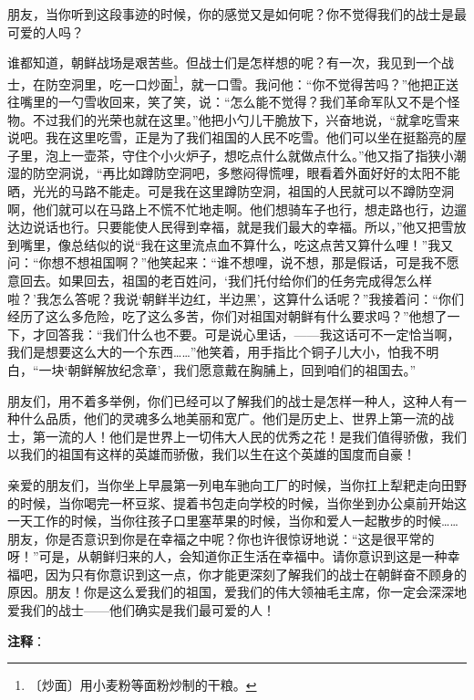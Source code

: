 \documentclass[12pt,UTF-8,openany]{ctexbook}
\begin{document}
\begin{normalsize}
    朋友，当你听到这段事迹的时候，你的感觉又是如何呢？你不觉得我们的战士是最可爱的人吗？
    
    谁都知道，朝鲜战场是艰苦些。但战士们是怎样想的呢？有一次，我见到一个战士，在防空洞里，吃一口炒面\footnote{〔炒面〕用小麦粉等面粉炒制的干粮。}，就一口雪。我问他：“你不觉得苦吗？”他把正送往嘴里的一勺雪收回来，笑了笑，说：“怎么能不觉得？我们革命军队又不是个怪物。不过我们的光荣也就在这里。”他把小勺儿干脆放下，兴奋地说，“就拿吃雪来说吧。我在这里吃雪，正是为了我们祖国的人民不吃雪。他们可以坐在挺豁亮的屋子里，泡上一壶茶，守住个小火炉子，想吃点什么就做点什么。”他又指了指狭小潮湿的防空洞说，“再比如蹲防空洞吧，多憋闷得慌哩，眼看着外面好好的太阳不能晒，光光的马路不能走。可是我在这里蹲防空洞，祖国的人民就可以不蹲防空洞啊，他们就可以在马路上不慌不忙地走啊。他们想骑车子也行，想走路也行，边遛达边说话也行。只要能使人民得到幸福，就是我们最大的幸福。所以，”他又把雪放到嘴里，像总结似的说“我在这里流点血不算什么，吃这点苦又算什么哩！”我又问：“你想不想祖国啊？”他笑起来：“谁不想哩，说不想，那是假话，可是我不愿意回去。如果回去，祖国的老百姓问，‘我们托付给你们的任务完成得怎么样啦？’我怎么答呢？我说‘朝鲜半边红，半边黑’，这算什么话呢？”我接着问：“你们经历了这么多危险，吃了这么多苦，你们对祖国对朝鲜有什么要求吗？”他想了一下，才回答我：“我们什么也不要。可是说心里话，——我这话可不一定恰当啊，我们是想要这么大的一个东西……”他笑着，用手指比个铜子儿大小，怕我不明白，“一块‘朝鲜解放纪念章’，我们愿意戴在胸脯上，回到咱们的祖国去。”
    
    朋友们，用不着多举例，你们已经可以了解我们的战士是怎样一种人，这种人有一种什么品质，他们的灵魂多么地美丽和宽广。他们是历史上、世界上第一流的战士，第一流的人！他们是世界上一切伟大人民的优秀之花！是我们值得骄傲，我们以我们的祖国有这样的英雄而骄傲，我们以生在这个英雄的国度而自豪！
    
    亲爱的朋友们，当你坐上早晨第一列电车驰向工厂的时候，当你扛上犁耙走向田野的时候，当你喝完一杯豆浆、提着书包走向学校的时候，当你坐到办公桌前开始这一天工作的时候，当你往孩子口里塞苹果的时候，当你和爱人一起散步的时候……朋友，你是否意识到你是在幸福之中呢？你也许很惊讶地说：“这是很平常的呀！”可是，从朝鲜归来的人，会知道你正生活在幸福中。请你意识到这是一种幸福吧，因为只有你意识到这一点，你才能更深刻了解我们的战士在朝鲜奋不顾身的原因。朋友！你是这么爱我们的祖国，爱我们的伟大领袖毛主席，你一定会深深地爱我们的战士——他们确实是我们最可爱的人！
    
\end{normalsize}


\newpage

\textbf{注释}：
\end{document}
